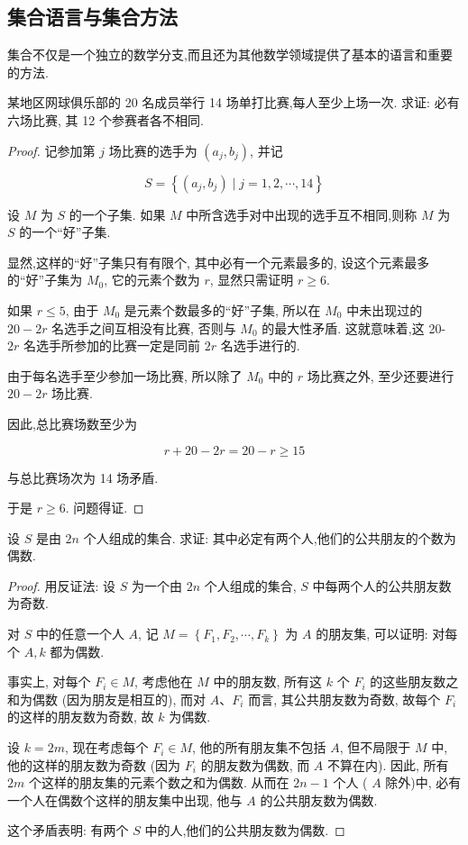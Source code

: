 \subsection{集合语言与集合方法}
集合不仅是一个独立的数学分支,而且还为其他数学领域提供了基本的语言和重要的方法.
\begin{example}
	某地区网球俱乐部的 20 名成员举行 14 场单打比赛,每人至少上场一次. 求证: 必有六场比赛, 其 12 个参赛者各不相同.
\end{example}
\begin{proof}
记参加第 $j$ 场比赛的选手为 $\left(a_{j}, b_{j}\right)$, 并记

$$
S=\left\{\left(a_{j}, b_{j}\right) \mid j=1,2, \cdots, 14\right\}
$$

设 $M$ 为 $S$ 的一个子集. 如果 $M$ 中所含选手对中出现的选手互不相同,则称 $M$ 为 $S$ 的一个“好”子集.

显然,这样的“好”子集只有有限个, 其中必有一个元素最多的, 设这个元素最多的“好”子集为 $M_{0}$, 它的元素个数为 $r$, 显然只需证明 $r \geqslant 6$.

如果 $r \leqslant 5$, 由于 $M_{0}$ 是元素个数最多的“好”子集, 所以在 $M_{0}$ 中未出现过的 $20-2 r$ 名选手之间互相没有比赛, 否则与 $M_{0}$ 的最大性矛盾. 这就意味着,这 20- $2 r$ 名选手所参加的比赛一定是同前 $2 r$ 名选手进行的.

由于每名选手至少参加一场比赛, 所以除了 $M_{0}$ 中的 $r$ 场比赛之外, 至少还要进行 $20-2 r$ 场比赛.

因此,总比赛场数至少为

$$
r+20-2 r=20-r \geqslant 15
$$

与总比赛场次为 14 场矛盾.

于是 $r \geqslant 6$. 问题得证.
\end{proof}

\begin{example}
设 $S$ 是由 $2 n$ 个人组成的集合. 求证: 其中必定有两个人,他们的公共朋友的个数为偶数.
\end{example}
\begin{proof}
用反证法: 设 $S$ 为一个由 $2 n$ 个人组成的集合, $S$ 中每两个人的公共朋友数为奇数.

对 $S$ 中的任意一个人 $A$, 记 $M=\left\{F_{1}, F_{2}, \cdots, F_{k}\right\}$ 为 $A$ 的朋友集, 可以证明: 对每个 $A, k$ 都为偶数.

事实上, 对每个 $F_{i} \in M$, 考虑他在 $M$ 中的朋友数, 所有这 $k$ 个 $F_{i}$ 的这些朋友数之和为偶数 (因为朋友是相互的), 而对 $A 、 F_{i}$ 而言, 其公共朋友数为奇数, 故每个 $F_{i}$ 的这样的朋友数为奇数, 故 $k$ 为偶数.

设 $k=2 m$, 现在考虑每个 $F_{i} \in M$, 他的所有朋友集不包括 $A$, 但不局限于 $M$ 中, 他的这样的朋友数为奇数 (因为 $F_{i}$ 的朋友数为偶数, 而 $A$ 不算在内). 因此, 所有 $2 m$ 个这样的朋友集的元素个数之和为偶数. 从而在 $2 n-1$ 个人 ( $A$ 除外)中, 必有一个人在偶数个这样的朋友集中出现, 他与 $A$ 的公共朋友数为偶数.

这个矛盾表明: 有两个 $S$ 中的人,他们的公共朋友数为偶数.
\end{proof}

